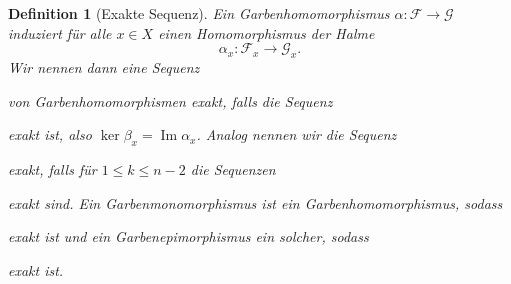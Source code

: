 \documentclass[11pt,a4paper,toc=bibliography]{scrartcl}
\theoremstyle{def}
\newtheorem{defi}{Definition}[section]
\theoremstyle{thm}
\theoremstyle{remark}
\DeclareMathOperator{\Ima}{Im}
\begin{document}
\begin{defi}[Exakte Sequenz]
Ein Garbenhomomorphismus $\alpha : \mathcal{F}\rightarrow \mathcal{G}$ induziert für alle $x\in X$ einen Homomorphismus der Halme 
\[
\alpha_x : \mathcal{F}_x \rightarrow \mathcal{G}_x.
\]
Wir nennen dann eine Sequenz
\begin{center}
\end{center}
von Garbenhomomorphismen \emph{exakt}, falls die Sequenz
\begin{center}
\end{center}
exakt ist, also $\ker \beta_x =\Ima \alpha_x$.
Analog nennen wir die Sequenz
\begin{center}
\end{center}
\emph{exakt}, falls für $1\leq k\leq n-2$ die Sequenzen
\begin{center}
\end{center}
exakt sind.
Ein Garben\emph{monomorphismus} ist ein Garbenhomomorphismus, sodass 
\begin{center}
\end{center}
exakt ist und ein Garben\emph{epimorphismus} ein solcher, sodass
\begin{center}
\end{center}
exakt ist.
\end{defi}
\end{document}
